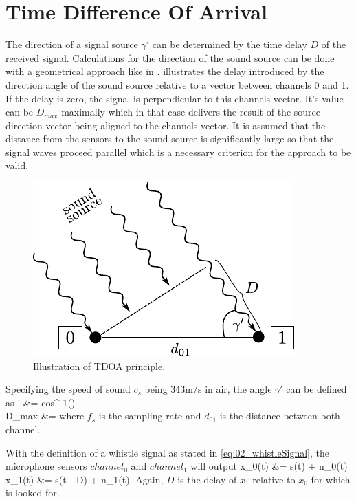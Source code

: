 \section{Time Difference Of Arrival}
\label{sec:02_tdoa}

The direction of a signal source $\gamma'$ can be determined by the time
delay $D$ of the received signal.
Calculations for the direction of the sound source can be done with a
geometrical approach like in \cite{Valin_Michaud}.
 illustrates the delay introduced by the direction angle
of the sound source relative to a vector between channels 0 and 1.
If the delay is zero, the signal is perpendicular to this channels vector.
It's value can be $D_{max}$ maximally which in that case delivers the
result of the source direction vector being aligned to the channels vector.
It is assumed that the distance from the sensors to the sound source is
significantly large so that the signal waves proceed parallel which is a necessary
criterion for the approach to be valid.
\begin{figure}[ht]
	\centering
		\includegraphics[width=0.4\columnwidth]{figures/tdoa_waves}
	\caption{Illustration of TDOA principle.}
    \label{fig:02_tdoa}
\end{figure}

Specifying the speed of sound $c_s$ being 343\si{m/s} in air, the angle
$\gamma'$ can be defined as
\bsub \bal
    \gamma' &= cos^{-1}()
    \label{eq:02_tdoaAngle}\\
    D_{max} &= 
\eal \esub
where $f_s$ is the sampling rate and $d_{01}$ is the distance between both channel.

With the definition of a whistle signal as stated in \cref{eq:02_whistleSignal},
the microphone sensors $channel_0$ and $channel_1$ will output
\bsub \bal
    x_0(t) &= s(t) + n_0(t)\\
    x_1(t) &= \alpha s(t - D) + n_1(t).
\eal \esub
\label{eq:02_signalTimeDomain}
Again, $D$ is the delay of $x_1$ relative to $x_0$ for which is looked for.